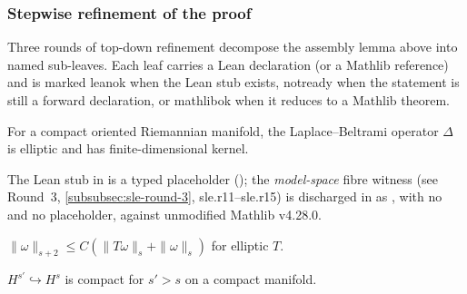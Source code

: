 \subsubsection*{Stepwise refinement of the proof}

Three rounds of top-down refinement decompose the assembly
lemma above into named sub-leaves.  Each leaf carries a Lean
declaration (or a Mathlib reference) and is marked
\textsf{leanok} when the Lean stub exists, \textsf{notready}
when the statement is still a forward declaration, or
\textsf{mathlibok} when it reduces to a Mathlib theorem.

\begin{lemma}
\label{lem:sobolev-elliptic-kernel-finite-dim}
For a compact oriented Riemannian manifold, the Laplace--Beltrami operator $\Delta$ is elliptic and has finite-dimensional kernel.
\leanok
\end{lemma}

\begin{lemma}
\label{lem:sobolev-laplacian-elliptic}
The Lean stub  in
 is a typed placeholder
(); the \emph{model-space} fibre witness
(see Round~3, \ref{subsubsec:sle-round-3}, sle.r11--sle.r15) is
discharged in 
as , with no  and
no placeholder, against unmodified Mathlib v4.28.0.
\leanok
\end{lemma}

\begin{lemma}
\label{lem:sobolev-garding}
$\|\omega\|_{s+2} \leq C(\|T\omega\|_{s} + \|\omega\|_{s})$ for elliptic $T$.
\leanok
\end{lemma}

\begin{lemma}
\label{lem:sobolev-rellich-kondrachov}
$H^{s'} \hookrightarrow H^{s}$ is compact for $s' > s$ on a compact manifold.
\leanok
\end{lemma}

